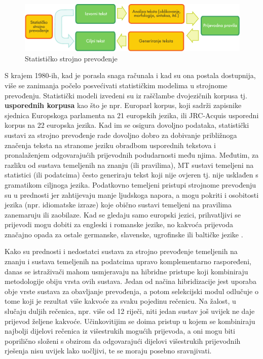 \begin{multicols}{2}
\begin{figure}[htb]
  \center
  \includegraphics[width=\textwidth]{../_media/croatian/machine_translation}
  \caption{Statističko strojno prevođenje}
  \label{fig:mtarch_cro}
\end{figure}

S krajem 1980-ih, kad je porasla snaga računala i kad su ona postala dostupnija, više se zanimanja počelo posvećivati statističkim modelima u strojnome prevođenju. Statistički modeli izvedeni su iz raščlambe dvojezičnih korpusa tj. \textbf{usporednih korpusa} kao što je npr. Europarl korpus, koji sadrži zapisnike sjednica Europskoga parlamenta na 21 europskih jezika, ili JRC-Acquis usporedni korpus \cite{pro6} na 22 europska jezika. Kad im se osigura dovoljno podataka, statistički sustavi za strojno prevođenje rade dovoljno dobro za dobivanje približnoga značenja teksta na stranome jeziku obradbom usporednih tekstova i pronalaženjem odgovarajućih prijevodnih podudarnosti među njima. Međutim, za razliku od sustava temeljenih na znanju (ili pravilima), MT sustavi temeljeni na statistici (ili podatcima) često generiraju tekst koji nije ovjeren tj. nije usklađen s gramatikom ciljnoga jezika. Podatkovno temeljeni pristupi strojnome prevođenju su u prednosti jer zahtijevaju manje ljudskoga napora, a mogu pokriti i osobitosti jezika (npr. idiomatske izraze) koje obično sustavi temeljeni na pravilima zanemaruju ili zaobilaze. Kad se gledaju samo europski jezici, prihvatljivi se prijevodi mogu dobiti za engleski i romanske jezike, no kakvoća prijevoda značajno opada za ostale germanske, slavenske, ugrofinske ili baltičke jezike \cite{pro2}.

 
Kako su prednosti i nedostatci sustava za strojno prevođenje temeljenih na znanju i sustava temeljenih na podatcima upravo komplementarno raspoređeni, danas se istraživači mahom usmjeravaju na hibridne pristupe koji kombiniraju metodologije obiju vrsta ovih sustava. Jedan od načina hibridizacije jest uporaba obje vrste sustava za obavljanje prevođenja, a potom selekcijski modul odlučuje o tome koji je rezultat više kakvoće za svaku pojedinu rečenicu. Na žalost, u slučaju duljih rečenica, npr. više od 12 riječi, niti jedan sustav još uvijek ne daje prijevod željene kakvoće. Učinkovitijim se doima pristup u kojem se kombiniraju najbolji dijelovi rečenica iz višestrukih mogućih prijevoda, a oni mogu biti poprilično složeni s obzirom da odgovarajući dijelovi višestrukih prijevodnih rješenja nisu uvijek lako uočljivi, te se moraju posebno sravnjivati. 


\end{multicols}
